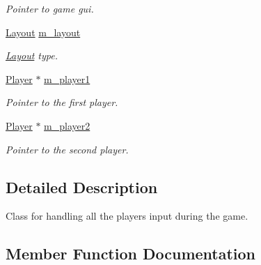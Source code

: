 \begin{DoxyCompactItemize}
\begin{DoxyCompactList}\small\item\em Pointer to game gui. \end{DoxyCompactList}\item 
\hyperlink{structLayout}{Layout} \hyperlink{classMultiplayer__State_ab6ce81448a5e3cc228e33547b4034cd1}{m\+\_\+layout}\hypertarget{classMultiplayer__State_ab6ce81448a5e3cc228e33547b4034cd1}{}\label{classMultiplayer__State_ab6ce81448a5e3cc228e33547b4034cd1}

\begin{DoxyCompactList}\small\item\em \hyperlink{structLayout}{Layout} type. \end{DoxyCompactList}\item 
\hyperlink{classPlayer}{Player} $\ast$ \hyperlink{classMultiplayer__State_ac051594a0b6bc7b586a2dd82a6141cbc}{m\+\_\+player1}\hypertarget{classMultiplayer__State_ac051594a0b6bc7b586a2dd82a6141cbc}{}\label{classMultiplayer__State_ac051594a0b6bc7b586a2dd82a6141cbc}

\begin{DoxyCompactList}\small\item\em Pointer to the first player. \end{DoxyCompactList}\item 
\hyperlink{classPlayer}{Player} $\ast$ \hyperlink{classMultiplayer__State_a330aea7939a2a56690e5c4aa5b4d92b7}{m\+\_\+player2}\hypertarget{classMultiplayer__State_a330aea7939a2a56690e5c4aa5b4d92b7}{}\label{classMultiplayer__State_a330aea7939a2a56690e5c4aa5b4d92b7}

\begin{DoxyCompactList}\small\item\em Pointer to the second player. \end{DoxyCompactList}\end{DoxyCompactItemize}


\subsection{Detailed Description}
Class for handling all the players input during the game. 

\subsection{Member Function Documentation}
